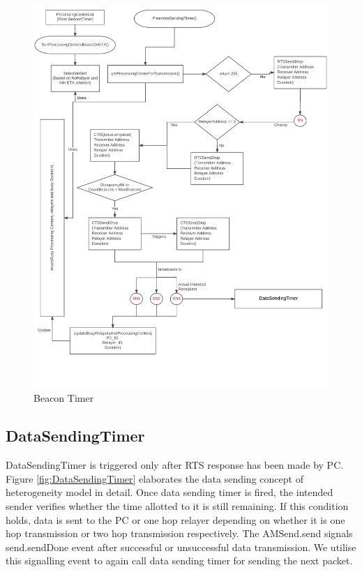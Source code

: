 	\begin{figure}
    \centering
    \includegraphics[width=1.0\textwidth]{gfx/PreambleSendingTimer.png}
    \caption{Beacon Timer}
    \label{fig:PreambleTimer}
    \end{figure}
    
	\subsection*{DataSendingTimer}
	
	DataSendingTimer is triggered only after \ac{RTS} response has been made by \ac{PC}. Figure \ref{fig:DataSendingTimer} elaborates the data sending concept of heterogeneity model in detail. Once data sending timer is fired, the intended sender verifies whether the time allotted to it is still remaining. If this condition holds, data is sent to the \ac{PC} or one hop relayer depending on whether it is one hop transmission or two hop transmission respectively. The AMSend.send signals send.sendDone event after successful or unsuccessful data transmission. We utilise this signalling event to again call data sending timer for sending the next packet. 
	
